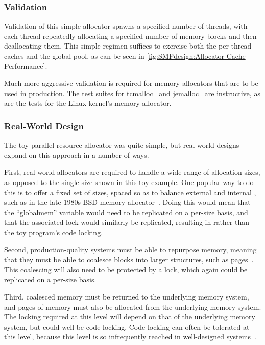 \subsubsection{Validation}

Validation of this simple allocator spawns a specified number of threads,
with each thread repeatedly allocating a specified number of memory
blocks and then deallocating them.
This simple regimen suffices to exercise both the per-thread caches
and the global pool, as can be seen in
\cref{fig:SMPdesign:Allocator Cache Performance}.

Much more aggressive validation is required for memory allocators that
are to be used in production.
The test suites for tcmalloc~\cite{ChrisKennelly2020tcmalloc} and
jemalloc~\cite{JasonEvans2011jemalloc} are instructive, as are the
tests for the Linux kernel's memory allocator.

\subsubsection{Real-World Design}

The toy parallel resource allocator was quite simple, but real-world
designs expand on this approach in a number of ways.

First, real-world allocators are required to handle a wide range
of allocation sizes, as opposed to the single size shown in this
toy example.
One popular way to do this is to offer a fixed set of sizes, spaced
so as to balance external and internal , such as in
the late-1980s BSD memory allocator~\cite{McKusick88}.
Doing this would mean that the ``globalmem'' variable would need
to be replicated on a per-size basis, and that the associated
lock would similarly be replicated, resulting in 
rather than the toy program's code locking.

Second, production-quality systems must be able to repurpose memory,
meaning that they must be able to coalesce blocks into larger structures,
such as pages~\cite{McKenney93}.
This coalescing will also need to be protected by a lock, which again
could be replicated on a per-size basis.

Third, coalesced memory must be returned to the underlying memory
system, and pages of memory must also be allocated from the underlying
memory system.
The locking required at this level will depend on that of the underlying
memory system, but could well be code locking.
Code locking can often be tolerated at this level, because this
level is so infrequently reached in well-designed systems~\cite{McKenney01e}.

